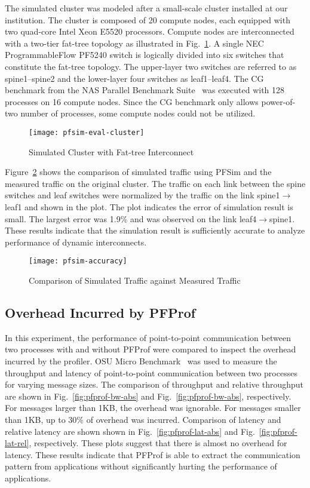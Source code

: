 The simulated cluster was modeled after a small-scale cluster installed at our
institution. The cluster is composed of 20 compute nodes, each equipped with
two quad-core Intel Xeon E5520 processors. Compute nodes are interconnected
with a two-tier fat-tree topology as illustrated in
Fig.~\ref{fig:cluster-config}. A single NEC ProgrammableFlow PF5240 switch is
logically divided into six switches that constitute the fat-tree topology.
The upper-layer two switches are referred to as spine1--spine2 and the
lower-layer four switches as leaf1--leaf4. The CG benchmark from the
NAS Parallel Benchmark Suite~\autocite{Bailey1991} was executed with 128
processes on 16 compute nodes. Since the CG benchmark only allows power-of-two
number of processes, some compute nodes could not be utilized.

\begin{figure}
    \centering
    \texttt{[image: pfsim-eval-cluster]}
    \caption{Simulated Cluster with Fat-tree Interconnect}%
    \label{fig:cluster-config}
\end{figure}

Figure~\ref{fig:pfsim-accuracy} shows the comparison of simulated traffic
using PFSim and the measured traffic on the original cluster. The traffic on
each link between the spine switches and leaf switches were normalized by the
traffic on the link spine1$\rightarrow$leaf1 and shown in the plot. The plot
indicates the error of simulation result is small. The largest error was 1.9\%
and was observed on the link leaf4$\rightarrow$spine1. These results indicate
that the simulation result is sufficiently accurate to analyze performance of
dynamic interconnects.

\begin{figure}
    \centering
    \texttt{[image: pfsim-accuracy]}
    \caption{Comparison of Simulated Traffic against Measured Traffic}%
    \label{fig:pfsim-accuracy}
\end{figure}

\subsection{Overhead Incurred by PFProf}

In this experiment, the performance of point-to-point communication
between two processes with and without PFProf were compared to inspect
the overhead incurred by the profiler. OSU Micro
Benchmark~\autocite{omb} was used to measure the throughput and latency
of point-to-point communication between two processes for varying
message sizes. The comparison of throughput and relative throughput are shown
in Fig.~\ref{fig:pfprof-bw-abs} and Fig.~\ref{fig:pfprof-bw-abs},
respectively. For messages larger than 1KB, the overhead was ignorable. For
messages smaller than 1KB, up to 30\% of overhead was incurred. Comparison of
latency and relative latency are shown shown in Fig.~\ref{fig:pfprof-lat-abs}
and Fig.~\ref{fig:pfprof-lat-rel}, respectively. These plots suggest that
there is almost no overhead for latency. These results indicate that PFProf is
able to extract the communication pattern from applications without
significantly hurting the performance of applications.

